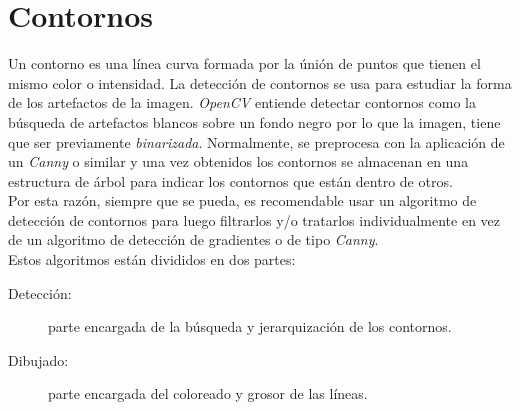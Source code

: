 \section{Contornos}
Un contorno es una línea curva formada por la únión de puntos que
tienen el mismo color o intensidad. La detección de contornos se usa
para estudiar la forma de los artefactos de la imagen. \emph{OpenCV}
entiende detectar contornos como la búsqueda de artefactos blancos
sobre un fondo negro por lo que la imagen, tiene que ser previamente
\emph{binarizada}. Normalmente, se preprocesa con la aplicación de un
\emph{Canny} o similar y una vez obtenidos los contornos se almacenan
en una estructura de árbol para indicar los contornos que están dentro
de otros. \\
Por esta razón, siempre que se pueda, es recomendable usar un
algoritmo de detección de contornos para luego filtrarlos y/o
tratarlos individualmente en vez de un algoritmo de detección de
gradientes o de tipo \emph{Canny}.\\
Estos algoritmos están divididos en dos partes:
\begin{description}
\item[Detección:] parte encargada de la búsqueda y jerarquización de
  los contornos.
\item[Dibujado:] parte encargada del coloreado y grosor de las líneas.
\end{description}

